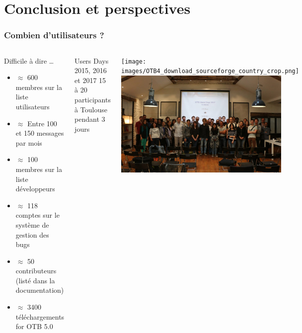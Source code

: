 \documentclass[8pt]{beamer}
\begin{document}
\section{Conclusion et perspectives}
\begin{frame}
\frametitle{Combien d'utilisateurs ?}
\begin{columns}[c]
\begin{block}{Difficile à dire \ldots}
\begin{itemize}
    \item $\approx$ 600 membres sur la liste utilisateurs
    \item $\approx$ Entre 100 et 150 messages par mois
    \item $\approx$ 100 membres sur la liste développeurs
    \item $\approx$ 118 comptes sur le système de gestion des bugs
    \item $\approx$ 50 contributeurs (listé dans la documentation)
    \item $\approx$ 3400 téléchargements for OTB 5.0
  \end{itemize}
\end{block}
\begin{block}{Users Days 2015, 2016 et 2017}
  15 à 20 participants à Toulouse pendant 3 jours
\end{block}
\texttt{[image: images/OTB4\_download\_sourceforge\_country\_crop.png]}\\
\includegraphics[width=0.9\textwidth]{images/userdays2017.jpg}
\end{columns}

\end{frame}
\end{document}
